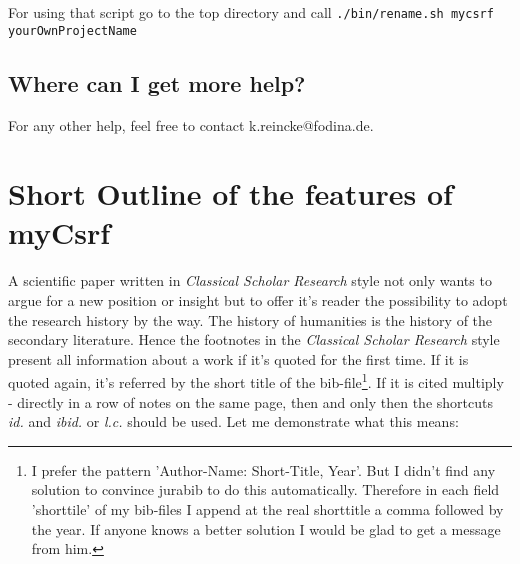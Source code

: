 \documentclass[
  DIV=calc,
  BCOR=5mm,
  11pt,
  headings=small,
  oneside,
  abstract=true,
  toc=bib,
  ngerman,english]{scrartcl}
\begin{document}
For using that script go to the top directory and call
\texttt{./bin/rename.sh mycsrf yourOwnProjectName}

\subsection{Where can I get more help?}

For any other help, feel free to contact k.reincke@fodina.de.


\section{Short Outline of the features of myCsrf}

A scientific paper written in \textit{Classical Scholar Research} style not only
wants to argue for a new position or insight but to offer it's reader
the possibility to adopt the research history by the way. The history of
humanities is the history of the secondary literature. Hence the footnotes in
the \textit{Classical Scholar Research} style present all information about a work
if it's quoted for the first time. If it is quoted again, it's referred by the
short title of the bib-file\footnote{I prefer the pattern 'Author-Name:
Short-Title, Year'. But I didn't find any solution to convince jurabib to do
this automatically. Therefore in each field 'shorttile' of my bib-files I append
at the real shorttitle a comma followed by the year. If anyone knows a better
solution I would be glad to get a message from him.}. If it is cited multiply -
directly in a row of notes on the same page, then and only then the shortcuts \textit{id.}
and \textit{ibid.} or \textit{l.c.} should be used. Let me demonstrate what
this means:
\end{document}
